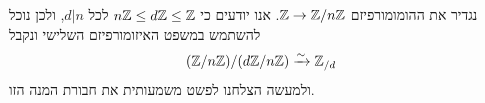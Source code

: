 \begin{example}
	נגדיר את ההומומורפיזם $\mathbb{Z} \to \mathbb{Z} / n\mathbb{Z}$. אנו יודעים כי $n \mathbb{Z} \le d \mathbb{Z} \le \mathbb{Z}$ לכל $d \big| n$, ולכן נוכל להשתמש במשפט האיזומורפיזם השלישי ונקבל
	\[
		(\mathbb{Z}/n\mathbb{Z})/(d\mathbb{Z}/n\mathbb{Z}) \xrightarrow{\sim} \mathbb{Z}_{/d}
	\]
	ולמעשה הצלחנו לפשט משמעותית את חבורת המנה הזו.
\end{example}


